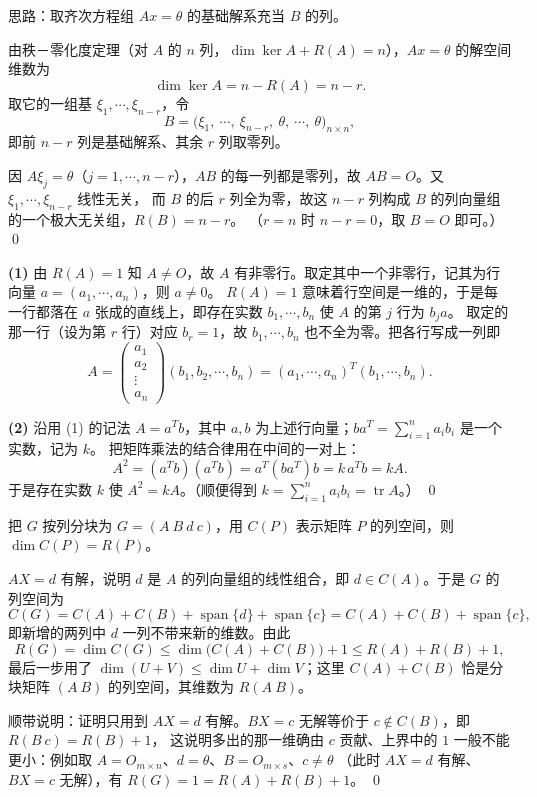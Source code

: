 \begin{solution}
思路：取齐次方程组 $Ax=\theta$ 的基础解系充当 $B$ 的列。

由秩－零化度定理（对 $A$ 的 $n$ 列，$\dim\ker A+R(A)=n$），$Ax=\theta$ 的解空间维数为
\[
\dim\ker A=n-R(A)=n-r .
\]
取它的一组基 $\xi_1,\cdots,\xi_{n-r}$，令
\[
B=\bigl(\xi_1,\ \cdots,\ \xi_{n-r},\ \theta,\ \cdots,\ \theta\bigr)_{n\times n},
\]
即前 $n-r$ 列是基础解系、其余 $r$ 列取零列。

因 $A\xi_j=\theta$（$j=1,\cdots,n-r$），$AB$ 的每一列都是零列，故 $AB=O$。又 $\xi_1,\cdots,\xi_{n-r}$ 线性无关，
而 $B$ 的后 $r$ 列全为零，故这 $n-r$ 列构成 $B$ 的列向量组的一个极大无关组，$R(B)=n-r$。
（$r=n$ 时 $n-r=0$，取 $B=O$ 即可。）
\qed
\end{solution}

\begin{solution}
\textbf{(1)} 由 $R(A)=1$ 知 $A\ne O$，故 $A$ 有非零行。取定其中一个非零行，记其为行向量 $a=(a_1,\cdots,a_n)$，则 $a\ne0$。
$R(A)=1$ 意味着行空间是一维的，于是每一行都落在 $a$ 张成的直线上，即存在实数 $b_1,\cdots,b_n$ 使 $A$ 的第 $j$ 行为 $b_ja$。
取定的那一行（设为第 $r$ 行）对应 $b_r=1$，故 $b_1,\cdots,b_n$ 也不全为零。把各行写成一列即
\[
A=\begin{pmatrix}a_1\\ a_2\\ \vdots\\ a_n\end{pmatrix}(b_1,b_2,\cdots,b_n)=(a_1,\cdots,a_n)^{T}(b_1,\cdots,b_n).
\]

\textbf{(2)} 沿用 (1) 的记法 $A=a^{T}b$，其中 $a,b$ 为上述行向量；$ba^{T}=\sum_{i=1}^{n}a_ib_i$ 是一个实数，记为 $k$。
把矩阵乘法的结合律用在中间的一对上：
\[
A^{2}=(a^{T}b)(a^{T}b)=a^{T}(ba^{T})b=k\,a^{T}b=kA .
\]
于是存在实数 $k$ 使 $A^{2}=kA$。（顺便得到 $k=\sum_{i=1}^{n}a_ib_i=\operatorname{tr}A$。）
\qed
\end{solution}

\begin{solution}
把 $G$ 按列分块为 $G=(A\ B\ d\ c)$，用 $C(P)$ 表示矩阵 $P$ 的列空间，则 $\dim C(P)=R(P)$。

$AX=d$ 有解，说明 $d$ 是 $A$ 的列向量组的线性组合，即 $d\in C(A)$。于是 $G$ 的列空间为
\[
C(G)=C(A)+C(B)+\operatorname{span}\{d\}+\operatorname{span}\{c\}=C(A)+C(B)+\operatorname{span}\{c\},
\]
即新增的两列中 $d$ 一列不带来新的维数。由此
\[
R(G)=\dim C(G)\le\dim\bigl(C(A)+C(B)\bigr)+1\le R(A)+R(B)+1,
\]
最后一步用了 $\dim(U+V)\le\dim U+\dim V$；这里 $C(A)+C(B)$ 恰是分块矩阵 $(A\ B)$ 的列空间，其维数为 $R(A\ B)$。

顺带说明：证明只用到 $AX=d$ 有解。$BX=c$ 无解等价于 $c\notin C(B)$，即 $R(B\ c)=R(B)+1$，
这说明多出的那一维确由 $c$ 贡献、上界中的 $1$ 一般不能更小：例如取 $A=O_{m\times n}$、$d=\theta$、$B=O_{m\times s}$、$c\ne\theta$
（此时 $AX=d$ 有解、$BX=c$ 无解），有 $R(G)=1=R(A)+R(B)+1$。
\qed
\end{solution}

